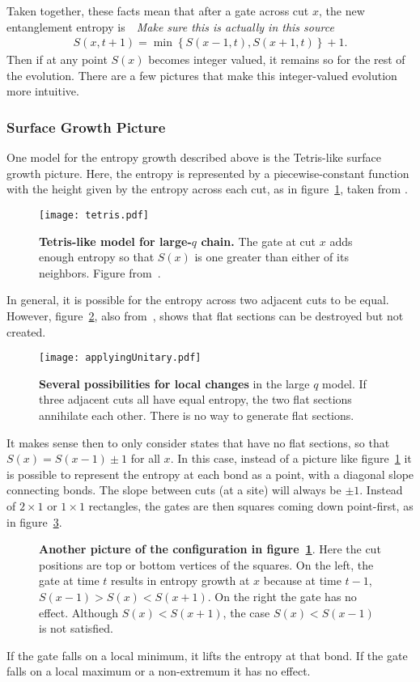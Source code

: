 Taken together, these facts mean that after a gate across cut $x$, the new entanglement entropy is~\cite{Buyskikh2016}~\emph{Make sure this is actually in this source}
\begin{align}
S(x, t+1) = \min\left\lbrace S(x-1, t), S(x+1, t)\right\rbrace + 1.
	\label{eqn:update}
\end{align}
Then if at any point $S(x)$ becomes integer valued, it remains so for the rest of the evolution. There are a few pictures that make this integer-valued evolution more intuitive.

\subsubsection{Surface Growth Picture}  \label{subsub:surfgrowth}

One model for the entropy growth described above is the Tetris-like surface growth picture. Here, the entropy is represented by a piecewise-constant function with the height given by the entropy across each cut, as in figure~\ref{fig:tetris}, taken from \cite{Nahum2017}. 
\begin{figure}
	\centering
	\texttt{[image: tetris.pdf]}
	\caption{\textbf{Tetris-like model for large-$q$ chain.} The gate at cut $x$ adds enough entropy so that $S(x)$ is one greater than either of its neighbors. Figure from~\cite{Nahum2017}.}
	\label{fig:tetris}
\end{figure}
In general, it is possible for the entropy across two adjacent cuts to be equal. However, figure~\ref{fig:applyingUnitary}, also from~\cite{Nahum2017}, shows that flat sections can be destroyed but not created. 
\begin{figure}
	\centering
	\texttt{[image: applyingUnitary.pdf]}
	\caption{\textbf{Several possibilities for local changes} in the large $q$ model. If three adjacent cuts all have equal entropy, the two flat sections annihilate each other. There is no way to generate flat sections.}
	\label{fig:applyingUnitary}
\end{figure}

It makes sense then to only consider states that have no flat sections, so that $S(x) = S(x-1)\pm1$ for all $x$. In this case, instead of a picture like figure~\ref{fig:tetris} it is possible to represent the entropy at each bond as a point, with a diagonal slope connecting bonds. The slope between cuts (at a site) will always be $\pm1$. Instead of $2\times1$ or $1\times1$ rectangles, the gates are then squares coming down point-first, as in figure~\ref{fig:diaggate}. 
\begin{figure}
	\centering
	
	\caption{\textbf{Another picture of the configuration in figure~\ref{fig:tetris}}. Here the cut positions are top or bottom vertices of the squares. On the left, the gate at time $t$ results in entropy growth at $x$ because at time $t-1$, $S(x-1) > S(x) < S(x+1)$. On the right the gate has no effect. Although $S(x) < S(x+1)$, the case $S(x) < S(x-1)$ is not satisfied. }
	\label{fig:diaggate}
\end{figure}
If the gate falls on a local minimum, it lifts the entropy at that bond. If the gate falls on a local maximum or a non-extremum it has no effect.

